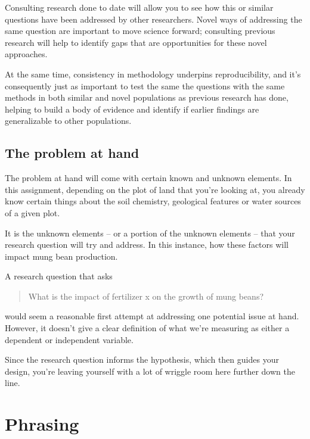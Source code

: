 \documentclass[
]{book}
\begin{document}
Consulting research done to date will allow you to see how this or similar questions have been addressed by other researchers. Novel ways of addressing the same question are important to move science forward; consulting previous research will help to identify gaps that are opportunities for these novel approaches.

At the same time, consistency in methodology underpins reproducibility, and it's consequently just as important to test the same the questions with the same methods in both similar and novel populations as previous research has done, helping to build a body of evidence and identify if earlier findings are generalizable to other populations.

\hypertarget{the-problem-at-hand}{%
\subsection*{The problem at hand}\label{the-problem-at-hand}}

The problem at hand will come with certain known and unknown elements. In this assignment, depending on the plot of land that you're looking at, you already know certain things about the soil chemistry, geological features or water sources of a given plot.

It is the unknown elements -- or a portion of the unknown elements -- that your research question will try and address. In this instance, how these factors will impact mung bean production.

A research question that asks

\begin{quote}
What is the impact of fertilizer x on the growth of mung beans?
\end{quote}

would seem a reasonable first attempt at addressing one potential issue at hand. However, it doesn't give a clear definition of what we're measuring as either a dependent or independent variable.

Since the research question informs the hypothesis, which then guides your design, you're leaving yourself with a lot of wriggle room here further down the line.

\hypertarget{phrasing}{%
\section*{Phrasing}\label{phrasing}}
\end{document}
